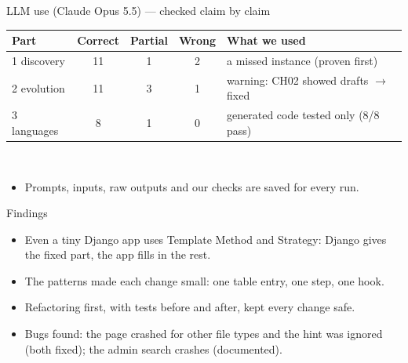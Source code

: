 \documentclass[aspectratio=169,11pt]{beamer}
\newcommand{\code}[1]{\texttt{\detokenize{#1}}}
\begin{document}
\begin{frame}{LLM use (Claude Opus 5.5) --- checked claim by claim}
\begin{tabular}{lcccl}\toprule
Part & Correct & Partial & Wrong & What we used\\\midrule
1 discovery & 11 & 1 & 2 & a missed instance (proven first)\\
2 evolution & 11 & 3 & 1 & warning: CH02 showed drafts $\rightarrow$ fixed\\
3 languages & 8 & 1 & 0 & generated code tested only (8/8 pass)\\\bottomrule
\end{tabular}\\[10pt]
\begin{itemize}
\item Prompts, inputs, raw outputs and our checks are saved for every run.
\end{itemize}
\end{frame}

\begin{frame}{Findings}
\begin{itemize}
\item Even a tiny Django app uses Template Method and Strategy: Django gives the fixed part, the app fills in the rest.
\item The patterns made each change small: one table entry, one step, one hook.
\item Refactoring first, with tests before and after, kept every change safe.
\item Bugs found: the page crashed for other file types and the \code{accept} hint was ignored (both fixed); the admin search crashes (documented).
\end{itemize}
\end{frame}
\end{document}
